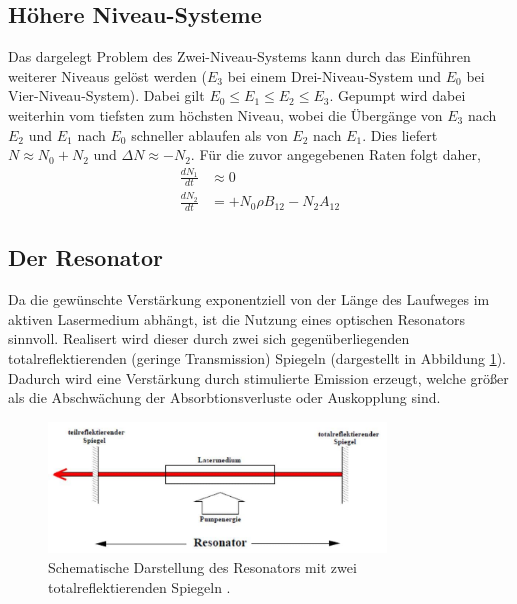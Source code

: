 \subsection{Höhere Niveau-Systeme}
Das dargelegt Problem des Zwei-Niveau-Systems kann durch das Einführen weiterer Niveaus gelöst werden ($E_3$ bei einem Drei-Niveau-System und $E_0$ bei Vier-Niveau-System).
Dabei gilt $E_0\leq E_1 \leq E_2 \leq E_3$. Gepumpt wird dabei weiterhin vom tiefsten zum höchsten Niveau, wobei die Übergänge von $E_3$ nach $E_2$ und $E_1$ nach $E_0$ schneller ablaufen als von $E_2$ nach $E_1$.
Dies liefert $N\approx N_0+N_2$ und $\Delta N \approx -N_2$.
Für die zuvor angegebenen Raten folgt daher,
\begin{align}
    \frac{dN_1}{dt}&\approx 0\\
    \frac{dN_2}{dt}&=+N_0\rho B_{12}-N_2A_{12}
\end{align}

\subsection{Der Resonator}
Da die gewünschte Verstärkung exponentziell von der Länge des Laufweges im aktiven Lasermedium abhängt, ist die Nutzung eines optischen Resonators sinnvoll.
Realisert wird dieser durch zwei sich gegenüberliegenden totalreflektierenden (geringe Transmission) Spiegeln (dargestellt in Abbildung \ref{fig:resonator}).
Dadurch wird eine Verstärkung durch stimulierte Emission erzeugt, welche größer als die Abschwächung der Absorbtionsverluste oder Auskopplung sind.

\begin{figure}
    \center
    \includegraphics[width=0.8\textwidth]{bilder/resonator.jpg}
    \caption{Schematische Darstellung des Resonators mit zwei totalreflektierenden Spiegeln \cite{anleitung}.}
    \label{fig:resonator}
\end{figure}

